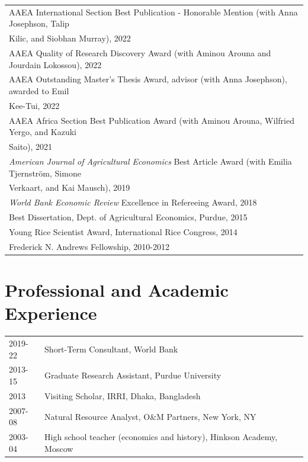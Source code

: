 \documentclass[letterpaper]{article}
\renewenvironment{itemize}{
  \begin{list}
  	{}{
    \setlength{\leftmargin}{1.5em}
    \setlength{\itemsep}{-.5em}
  }
}{
  \end{list}
}
\begin{document}
\begin{itemize}
\begin{tabular}{l}
		AAEA International Section Best Publication - Honorable Mention (with Anna Josephson, Talip  \\
		\hspace{0.1cm} Kilic, and Siobhan Murray), 2022 \\
		AAEA Quality of Research Discovery Award (with Aminou Arouna and Jourdain Lokossou), 2022 \\
		AAEA Outstanding Master's Thesis Award, advisor (with Anna Josephson), awarded to Emil \\
		\hspace{0.1cm} Kee-Tui, 2022 \\
		AAEA Africa Section Best Publication Award (with Aminou Arouna, Wilfried Yergo, and Kazuki \\
		\hspace{0.1cm} Saito), 2021 \\
		\emph{American Journal of Agricultural Economics} Best Article Award (with Emilia Tjernstr\"{o}m,
		Simone  \\
		\hspace{0.1cm} Verkaart, and Kai Mausch), 2019 \\
		\emph{World Bank Economic Review} Excellence in Refereeing Award, 2018 \\
		Best Dissertation,  Dept. of Agricultural Economics, Purdue, 2015 \\
		Young Rice Scientist Award, International Rice Congress, 2014 \\
		Frederick N. Andrews Fellowship, 2010-2012 \\
	\end{tabular}

\end{itemize}

\section*{\sc Professional and Academic Experience}
\begin{tabular}{ll}
	2019-22 & Short-Term Consultant, World Bank \\
	2013-15	& Graduate Research Assistant, Purdue University \\
	2013 	& Visiting Scholar, IRRI, Dhaka, Bangladesh \\
	2007-08 & Natural Resource Analyst, O\&M Partners, New York, NY \\
	2003-04 & High school teacher (economics and history), Hinkson Academy, Moscow \\
\end{tabular}
\end{document}
